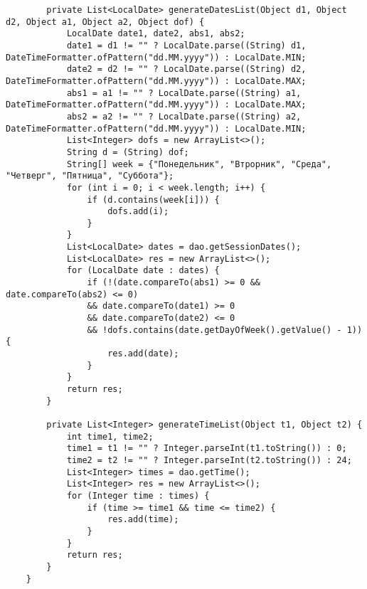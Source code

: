 \begin{lstlisting}
		private List<LocalDate> generateDatesList(Object d1, Object d2, Object a1, Object a2, Object dof) {
			LocalDate date1, date2, abs1, abs2;
			date1 = d1 != "" ? LocalDate.parse((String) d1, DateTimeFormatter.ofPattern("dd.MM.yyyy")) : LocalDate.MIN;
			date2 = d2 != "" ? LocalDate.parse((String) d2, DateTimeFormatter.ofPattern("dd.MM.yyyy")) : LocalDate.MAX;
			abs1 = a1 != "" ? LocalDate.parse((String) a1, DateTimeFormatter.ofPattern("dd.MM.yyyy")) : LocalDate.MAX;
			abs2 = a2 != "" ? LocalDate.parse((String) a2, DateTimeFormatter.ofPattern("dd.MM.yyyy")) : LocalDate.MIN;
			List<Integer> dofs = new ArrayList<>();
			String d = (String) dof;
			String[] week = {"Понедельник", "Втрорник", "Среда", "Четверг", "Пятница", "Суббота"};
			for (int i = 0; i < week.length; i++) {
				if (d.contains(week[i])) {
					dofs.add(i);
				}
			}
			List<LocalDate> dates = dao.getSessionDates();
			List<LocalDate> res = new ArrayList<>();
			for (LocalDate date : dates) {
				if (!(date.compareTo(abs1) >= 0 && date.compareTo(abs2) <= 0)
				&& date.compareTo(date1) >= 0
				&& date.compareTo(date2) <= 0
				&& !dofs.contains(date.getDayOfWeek().getValue() - 1)) {
					res.add(date);
				}
			}
			return res;
		}
		
		private List<Integer> generateTimeList(Object t1, Object t2) {
			int time1, time2;
			time1 = t1 != "" ? Integer.parseInt(t1.toString()) : 0;
			time2 = t2 != "" ? Integer.parseInt(t2.toString()) : 24;
			List<Integer> times = dao.getTime();
			List<Integer> res = new ArrayList<>();
			for (Integer time : times) {
				if (time >= time1 && time <= time2) {
					res.add(time);
				}
			}
			return res;
		}
	}
	
\end{lstlisting}